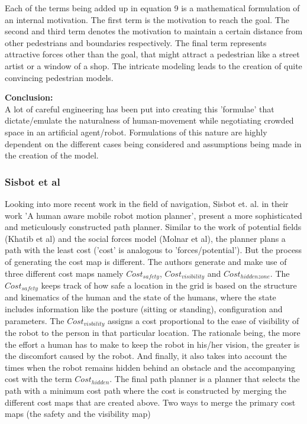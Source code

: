 Each of the terms being added up in equation 9 is a mathematical formulation of an internal motivation.
The first term is the motivation to reach the goal.
The second and third term denotes the motivation to maintain a certain distance from other pedestrians and boundaries respectively.
The final term represents attractive forces other than the goal, that might attract a pedestrian like a street artist or a window of a shop.
The intricate modeling leads to the creation of quite convincing pedestrian models. 
\par
\textbf{Conclusion:}\\
A lot of careful engineering has been put into creating this 'formulae' that dictate/emulate the naturalness of human-movement while negotiating crowded space in an artificial agent/robot. 
Formulations of this nature are highly dependent on the different cases being considered and assumptions being made in the creation of the model. 
\subsubsection*{Sisbot et al}
Looking into more recent work in the field of navigation,
Sisbot et. al. in their work 'A human aware mobile robot motion planner', present a more sophisticated and meticulously constructed path planner. Similar to the work of potential fields (Khatib et al) and the social forces model (Molnar et al), the planner plans a path with the least cost ('cost' is analogous to 'forces/potential'). But the process of generating the cost map is different.
The authors generate and make use of three different cost maps namely $Cost_{safety}$, $Cost_{visibility}$ and $Cost_{hidden zone}$.
The $Cost_{safety}$ keeps track of how safe a location in the grid is based on the structure and kinematics of the human and the state of the humans, where the state includes information like the posture (sitting or standing), configuration and parameters.
The $Cost_{visbility}$ assigns a cost proportional to the ease of visibility of the robot to the person in that particular location. The rationale being, the more the effort a human has to make to keep the robot in his/her vision, the greater is the discomfort caused by the robot.
And finally, it also takes into account the times when the robot remains hidden behind an obstacle and the accompanying cost with the term $Cost_{hidden}$. 
The final path planner is a planner that selects the path with a minimum cost path where the cost is constructed by merging the different cost maps that are created above.
Two ways to merge the primary cost maps (the safety and the visibility map)


